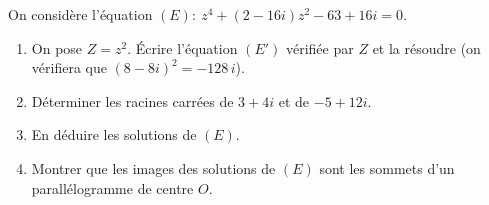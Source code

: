 %
\begin{exo}
	On consid\`ere l'\'equation $(E) : \ z^4 + (2 - 16i) z^2 - 63 + 16i = 0$.
	\begin{enumerate}
		\item On pose $Z = z^2$. \'Ecrire l'\'equation $(E')$ v\'erifi\'ee par $Z$ et la r\'esoudre
		      (on v\'erifiera que $(8 - 8i)^2 = -128\,i$).
		\item D\'eterminer les racines carr\'ees de $3 + 4i$ et de $-5 + 12i$.
		\item En d\'eduire les solutions de $(E)$.
		\item Montrer que les images des solutions de $(E)$ sont les sommets d'un parall\'elogramme de centre $O$.
	\end{enumerate}
\end{exo}
